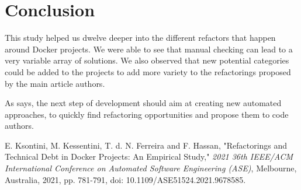 \documentclass[lettersize,journal]{IEEEtran}
\begin{document}
\section{Conclusion}
This study helped us dwelve deeper into the different refactors that happen around Docker projects.
We were able to see that manual checking can lead to a very variable array of solutions.
We also observed that new potential categories could be added to the projects to add more variety to the refactorings proposed by the main article authors.

As \cite{1} says, the next step of development should aim at creating new automated approaches, to quickly find refactoring opportunities and propose them to code authors.

\begin{thebibliography}{1}


E. Ksontini, M. Kessentini, T. d. N. Ferreira and F. Hassan, "Refactorings and Technical Debt in Docker Projects: An Empirical Study," \textit{2021 36th IEEE/ACM International Conference on Automated Software Engineering (ASE)}, Melbourne, Australia, 2021, pp. 781-791, doi: 10.1109/ASE51524.2021.9678585.

\end{thebibliography}

\vfill
\end{document}

